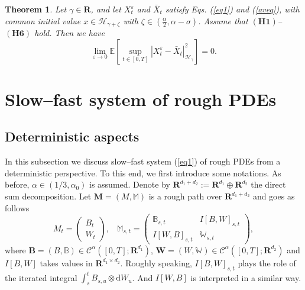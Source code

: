 \documentclass[10pt,a4paper]{article}
\newtheorem{theorem}{Theorem}[section]
\numberwithin{equation}{section}
\begin{document}
\begin{theorem}\label{MainRes}
	Let $\gamma \in \mathbf R$, and let $X_t^\varepsilon$ and $\bar{X}_t$ satisfy Eqs. (\ref{eq1}) and (\ref{aveq}), with common initial value $x \in \mathcal H_{\gamma+\zeta}$ with $\zeta \in (\frac \alpha2,\alpha-\sigma)$.
	Assume that $(\mathbf{H1})$--$(\mathbf{H6})$ hold. Then we have
	\begin{equation}\label{Averaging}
		\lim_{\varepsilon\rightarrow 0}  \mathbb E\left[\sup_{t \in [0,T]}|X_t^\varepsilon-\bar{X}_t|_{\mathcal H_\gamma}^{2}\right]=0.
	\end{equation}
\end{theorem}












\section{Slow--fast system of rough PDEs}\label{sect3}





\subsection{Deterministic aspects} \label{sect3.1}


In this subsection we discuss slow--fast system (\ref{eq1}) of rough PDEs from a deterministic perspective.
To this end, we first introduce some notations.
As before, $\alpha \in (1/3,\alpha_0)$ is assumed.
Denote by $\mathbf R^{d_1+d_2}:=\mathbf R^{d_1} \oplus \mathbf R^{d_2}$ the direct sum decomposition.
Let $\mathbf{M}=(M, \mathbb{M})$ is a rough path over $\mathbf R^{d_1+d_2}$ and goes as follows
\begin{equation} \label{mixRP}
	M_t=\begin{pmatrix} B_t \\ W_t  \end{pmatrix},   ~~~~\mathbb M_{s,t}=\begin{pmatrix} \mathbb{B}_{s,t} &\displaystyle I[B,W]_{s,t}  \\ \displaystyle I[W,B]_{s,t} & \mathbb W_{s,t} \end{pmatrix},
\end{equation}
where $\mathbf B=(B, \mathbb B) \in \mathscr{C}^{\alpha}([0,T]; \mathbf R^{d_1})$, $\mathbf W=(W, \mathbb W) \in \mathscr{C}^{\alpha}([0,T]; \mathbf R^{d_2})$ and $I[B,W]$ takes values in $\mathbf R^{d_1 \times d_2}$.
Roughly speaking, $I[B,W]_{s,t}$ plays the role of the iterated integral $\int_s^t B_{s,u} \otimes \mathrm{d} W_u$. And $I[W,B]$ is interpreted in a similar way.
\end{document}
